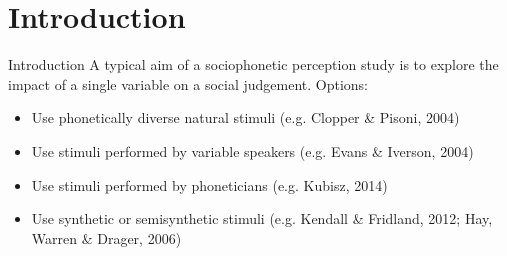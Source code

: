 \documentclass{beamer}
\begin{document}



\section{Introduction}
\begin{frame}{Introduction}
A typical aim of a sociophonetic perception study is to explore the impact of a single variable on a social judgement. 
Options:
\begin{itemize}
\item{Use phonetically diverse natural stimuli (e.g. Clopper \& Pisoni, 2004)}
\item{Use stimuli performed by variable speakers (e.g. Evans \& Iverson, 2004)}
\item{Use stimuli performed by phoneticians (e.g. Kubisz, 2014)}
\item{Use synthetic or semisynthetic stimuli (e.g. Kendall \& Fridland, 2012; Hay, Warren \& Drager, 2006)}
\end{itemize}
\end{frame}
\end{document}
